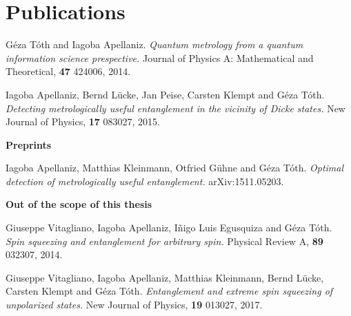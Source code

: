 \section*{Publications}
\label{sec:pu}

\begin{minipage}{\linewidth}
  \setlength{\parindent}{0cm}
  \textbullet\hspace{5pt}G\'eza T\'oth and Iagoba Apellaniz.
  \textit{Quantum metrology from a quantum information science prespective.}
  Journal of Physics A: Mathematical and Theoretical, \textbf{47} 424006, 2014.
  \vspace{6pt}

  \textbullet\hspace{5pt}Iagoba Apellaniz, Bernd L\"ucke, Jan Peise, Carsten Klempt and G\'eza T\'oth.
  \textit{Detecting metrologically useful entanglement in the vicinity of Dicke states.}
  New Journal of Physics, \textbf{17} 083027, 2015.
  \vspace{16pt}

  {\large\bf Preprints}
  \vspace{6pt}

  \textbullet\hspace{5pt}Iagoba Apellaniz, Matthias Kleinmann, Otfried G\"uhne and G\'eza T\'oth.
  \textit{Optimal detection of metrologically useful entanglement.}
  arXiv:1511.05203.
  \vspace{16pt}

  {\large\bf Out of the scope of this thesis}
  \vspace{6pt}

  \textbullet\hspace{5pt}Giuseppe Vitagliano, Iagoba Apellaniz, I\~nigo Luis Egusquiza and G\'eza T\'oth.
  \textit{Spin squeezing and entanglement for arbitrary spin.}
  Physical Review A, \textbf{89} 032307, 2014.
  \vspace{6pt}

  \textbullet\hspace{5pt}Giuseppe Vitagliano, Iagoba Apellaniz, Matthias Kleinmann, Bernd L\"ucke, Carsten Klempt and G\'eza T\'oth.
  \textit{Entanglement and extreme spin squeezing of unpolarized states.}
  New Journal of Physics, \textbf{19} 013027, 2017.
\end{minipage}
